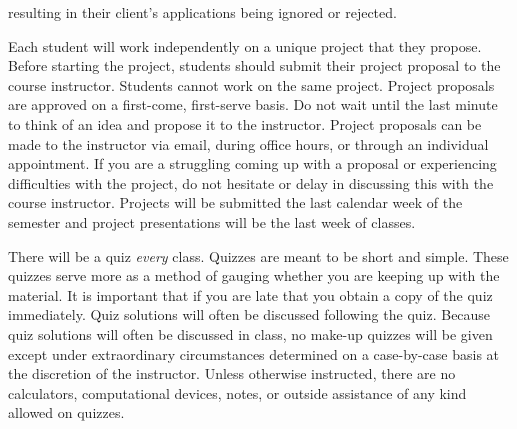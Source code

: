 \documentclass[11pt,letterpaper]{article}
\begin{document}
resulting in their client's applications being ignored or rejected. \par\vspace{0.4cm}

Each student will work independently on a unique project that they propose. Before starting the project, students should submit their project proposal to the course instructor. Students cannot work on the same project. Project proposals are approved on a first-come, first-serve basis. Do not wait until the last minute to think of an idea and propose it to the instructor. Project proposals can be made to the instructor via email, during office hours, or through an individual appointment. If you are a struggling coming up with a proposal or experiencing difficulties with the project, do not hesitate or delay in discussing this with the course instructor. Projects will be submitted the last calendar week of the semester and project presentations will be the last week of classes. 
\sectionbreak



There will be a quiz \textit{every} class. Quizzes are meant to be short and simple. These quizzes serve more as a method of gauging whether you are keeping up with the material. It is important that if you are late that you obtain a copy of the quiz immediately. Quiz solutions will often be discussed following the quiz. Because quiz solutions will often be discussed in class, no make-up quizzes will be given except under extraordinary circumstances determined on a case-by-case basis at the discretion of the instructor. Unless otherwise instructed, there are no calculators, computational devices, notes, or outside assistance of any kind allowed on quizzes. \pspace
\end{document}

